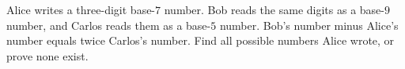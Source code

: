 Alice writes a three-digit base-$7$ number. Bob reads the same digits as a base-$9$ number, and Carlos reads them as a base-$5$ number. Bob's number minus Alice's number equals twice Carlos's number. Find all possible numbers Alice wrote, or prove none exist.
